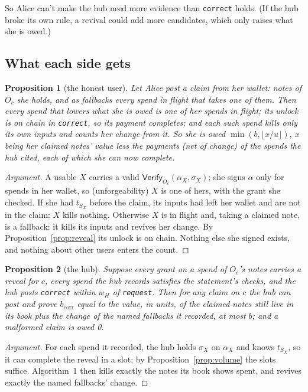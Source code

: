 \documentclass[11pt]{article}
\theoremstyle{plain}
\newtheorem{proposition}{Proposition}
\theoremstyle{definition}
\newcommand{\bcorr}{b_{\mathrm{corr}}}
\newcommand{\tx}[1]{\texttt{#1}}
\newcommand{\Vfy}{\mathsf{Verify}}
\newcommand{\Oc}{O_c}
\begin{document}
So Alice can't make the hub need more evidence than \tx{correct} holds.
(If the hub broke its own rule, a revival could add more candidates,
which only raises what she is owed.)

\subsection{What each side gets}

\begin{proposition}[the honest user]\label{prop:user}
Let Alice post a claim from her wallet: notes of $\Oc$ she holds, and as
fallbacks every spend in flight that takes one of them. Then every spend
that lowers what she is owed is one of her spends in flight; its unlock
is on chain in \tx{correct}, so its payment completes; and each such
spend kills only its own inputs and counts her change from it. So she is
owed $\min(b, \lfloor x/u \rfloor)$, $x$ being her claimed notes' value
less the payments (net of change) of the spends the hub cited, each of
which she can now complete.
\end{proposition}
\begin{proof}[Argument]
A usable $X$ carries a valid $\Vfy_{\Oc}(\alpha_X, \sigma_X)$; she signs
$\alpha$ only for spends in her wallet, so (unforgeability) $X$ is one of
hers, with the grant she checked. If she had $t_{S_X}$ before the claim,
its inputs had left her wallet and are not in the claim: $X$ kills
nothing. Otherwise $X$ is in flight and, taking a claimed note, is a
fallback: it kills its inputs and revives her change. By
Proposition~\ref{prop:reveal} its unlock is on chain. Nothing else she
signed exists, and nothing about other users enters the count.
\end{proof}

\begin{proposition}[the hub]\label{prop:hub}
Suppose every grant on a spend of $\Oc$'s notes carries a reveal for
$c$, every spend the hub records satisfies the statement's checks, and
the hub posts \tx{correct} within $w_H$ of \tx{request}.
Then for any claim on $c$ the hub can post and prove $\bcorr$ equal to
the value, in units, of the claimed notes still live in its book plus
the change of the named fallbacks it recorded, at most $b$; and a
malformed claim is owed 0.
\end{proposition}
\begin{proof}[Argument]
For each spend it recorded, the hub holds $\sigma_X$ on $\alpha_X$ and
knows $t_{S_X}$, so it can complete the reveal in a slot; by
Proposition~\ref{prop:volume} the slots suffice. Algorithm~1
then kills exactly the notes its book shows spent, and revives exactly
the named fallbacks' change.
\end{proof}
\end{document}
